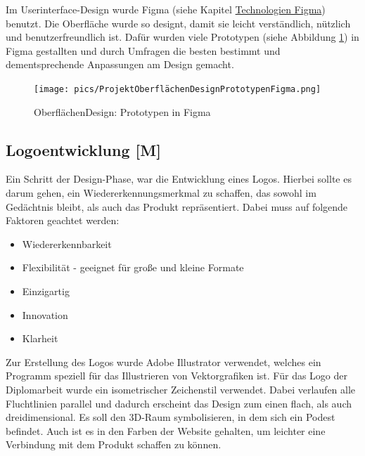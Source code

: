 Im Userinterface-Design wurde Figma (siehe Kapitel \hyperref[ch::technologies::figma]{Technologien Figma}) benutzt. Die Oberfläche wurde so designt, damit sie leicht verständlich, nützlich und benutzerfreundlich ist. Dafür wurden viele Prototypen (siehe Abbildung \ref{fig:impl:design:prototypesfigma}) in Figma gestallten und durch Umfragen die besten bestimmt und dementsprechende Anpassungen am Design gemacht.

\begin{figure}
    \centering
    \texttt{[image: pics/ProjektOberflächenDesignPrototypenFigma.png]}
    \caption{OberflächenDesign: Prototypen in Figma}
    \label{fig:impl:design:prototypesfigma}
\end{figure}


\subsection{Logoentwicklung [M]}
Ein Schritt der Design-Phase, war die Entwicklung eines Logos. Hierbei sollte es darum gehen, ein Wiedererkennungsmerkmal zu schaffen, das sowohl im Gedächtnis bleibt, als auch das Produkt repräsentiert. Dabei muss auf folgende Faktoren geachtet werden:

\begin{itemize}
    \item Wiedererkennbarkeit
    \item Flexibilität - geeignet für große und kleine Formate
    \item Einzigartig
    \item Innovation
    \item Klarheit
\end{itemize}
\cite{LogoKriterien}

Zur Erstellung des Logos wurde Adobe Illustrator verwendet, welches ein Programm speziell für das Illustrieren von Vektorgrafiken ist. Für das Logo der Diplomarbeit wurde ein isometrischer Zeichenstil verwendet. Dabei verlaufen alle Fluchtlinien parallel und dadurch erscheint das Design zum einen flach, als auch dreidimensional. Es soll den 3D-Raum symbolisieren, in dem sich ein Podest befindet. Auch ist es in den Farben der Website gehalten, um leichter eine Verbindung mit dem Produkt schaffen zu können.
\cite{IsometricStyle}
\cite{Logo}


